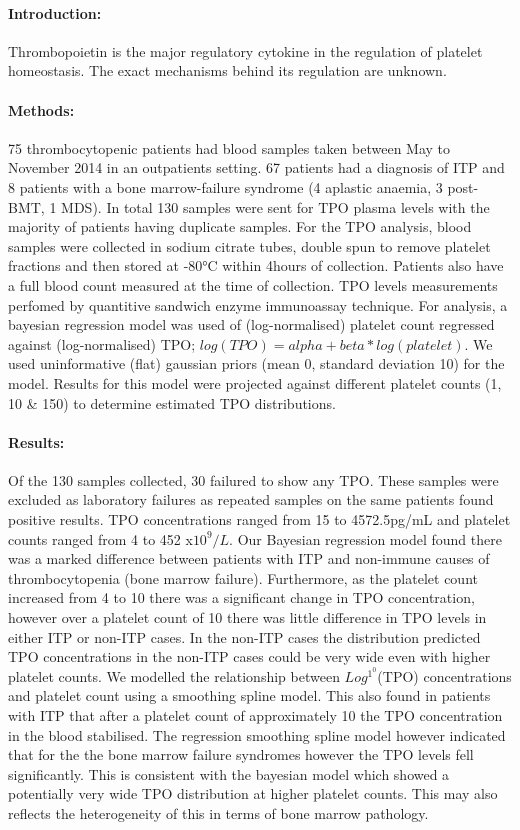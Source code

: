 \documentclass[11pt]{article}
\title{}
\author{}
\date{July 2018}
\begin{document}
\maketitle

\paragraph{Introduction:} Thrombopoietin is the major regulatory cytokine in the regulation of platelet homeostasis. The exact mechanisms behind its regulation are unknown. 
\paragraph{Methods:} 75 thrombocytopenic patients had blood samples taken between May to November 2014 in an outpatients setting. 67 patients had a diagnosis of ITP and 8 patients with a bone marrow-failure syndrome (4 aplastic anaemia, 3 post- BMT, 1 MDS). In total 130 samples were sent for TPO plasma levels with the majority of patients having duplicate samples. For the TPO analysis, blood samples were collected in sodium citrate tubes, double spun to remove platelet fractions and then stored at -80°C within 4hours of collection. Patients also have a full blood count measured at the time of collection. TPO levels measurements perfomed by quantitive sandwich enzyme immunoassay technique. For analysis, a bayesian regression model was used of (log-normalised) platelet count regressed against (log-normalised) TPO; $log(TPO) = alpha + beta*log(platelet)$. We used uninformative (flat) gaussian priors (mean 0, standard deviation 10) for the model. Results for this model were projected against different platelet counts (1, 10 & 150) to determine estimated TPO distributions.
\paragraph{Results:} Of the 130 samples collected, 30 failured to show any TPO. These samples were excluded as laboratory failures as repeated samples on the same patients found positive results. TPO concentrations ranged from 15 to 4572.5pg/mL and platelet counts ranged from 4 to 452 x$10^9/L$. 
Our Bayesian regression model found there was a marked difference between patients with ITP and non-immune causes of thrombocytopenia (bone marrow failure). Furthermore, as the platelet count increased from 4 to 10 there was a significant change in TPO concentration, however over a platelet count of 10 there was little difference in TPO levels in either ITP or non-ITP cases. In the non-ITP cases the distribution predicted TPO concentrations in the non-ITP cases could be very wide even with higher platelet counts. We modelled the relationship between $Log^1^0$(TPO) concentrations and platelet count using a smoothing spline model. This also found in patients with ITP that after a platelet count of approximately 10 the TPO concentration in the blood stabilised. The regression smoothing spline model however indicated that for the the bone marrow failure syndromes however the TPO levels fell significantly. This is consistent with the bayesian model which showed a potentially very wide TPO distribution at higher platelet counts. This may also reflects the heterogeneity of this in terms of bone marrow pathology.
\end{document}
